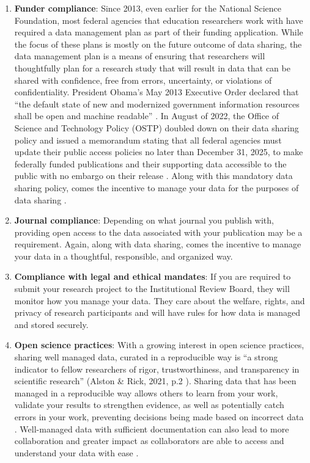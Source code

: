 \documentclass[
]{book}
\begin{document}
\begin{enumerate}
\def\labelenumi{\arabic{enumi}.}
\item
  \textbf{Funder compliance}: Since 2013, even earlier for the National Science Foundation, most federal agencies that education researchers work with have required a data management plan as part of their funding application. While the focus of these plans is mostly on the future outcome of data sharing, the data management plan is a means of ensuring that researchers will thoughtfully plan for a research study that will result in data that can be shared with confidence, free from errors, uncertainty, or violations of confidentiality. President Obama's May 2013 Executive Order declared that ``the default state of new and modernized government information resources shall be open and machine readable'' \autocite{the_white_house_executive_2013}. In August of 2022, the Office of Science and Technology Policy (OSTP) doubled down on their data sharing policy and issued a memorandum stating that all federal agencies must update their public access policies no later than December 31, 2025, to make federally funded publications and their supporting data accessible to the public with no embargo on their release \autocite{office_of_science_and_technology_policy_ostp_2022}. Along with this mandatory data sharing policy, comes the incentive to manage your data for the purposes of data sharing \autocite{borghi_promoting_2022}.
\item
  \textbf{Journal compliance}: Depending on what journal you publish with, providing open access to the data associated with your publication may be a requirement. Again, along with data sharing, comes the incentive to manage your data in a thoughtful, responsible, and organized way.
\item
  \textbf{Compliance with legal and ethical mandates}: If you are required to submit your research project to the Institutional Review Board, they will monitor how you manage your data. They care about the welfare, rights, and privacy of research participants and will have rules for how data is managed and stored securely.
\item
  \textbf{Open science practices}: With a growing interest in open science practices, sharing well managed data, curated in a reproducible way is ``a strong indicator to fellow researchers of rigor, trustworthiness, and transparency in scientific research'' (Alston \& Rick, 2021, p.2 \autocite{alston_beginners_2021}). Sharing data that has been managed in a reproducible way allows others to learn from your work, validate your results to strengthen evidence, as well as potentially catch errors in your work, preventing decisions being made based on incorrect data \autocite{alston_beginners_2021}. Well-managed data with sufficient documentation can also lead to more collaboration and greater impact as collaborators are able to access and understand your data with ease \autocite{borghi_promoting_2022,cowles_research_nodate}.
\end{enumerate}
\end{document}

